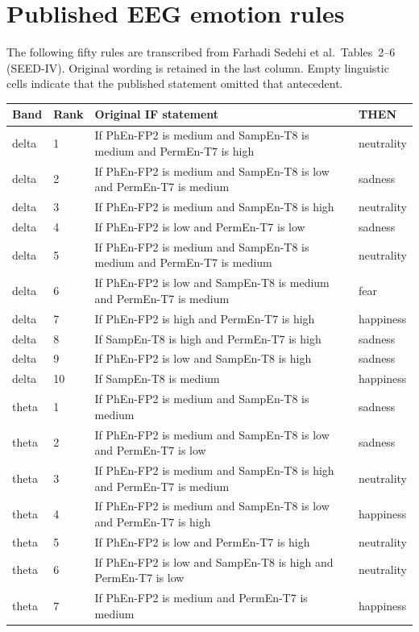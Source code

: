 \section{Published EEG emotion rules}
The following fifty rules are transcribed from Farhadi Sedehi et al.\ Tables~2--6 (SEED-IV). Original wording is retained in the last column. Empty linguistic cells indicate that the published statement omitted that antecedent.
\begin{longtable}{llp{7.2cm}l}
\toprule Band & Rank & Original IF statement & THEN \\
\midrule \endhead
delta & 1 & If PhEn-FP2 is medium and SampEn-T8 is medium and PermEn-T7 is high & neutrality \\
delta & 2 & If PhEn-FP2 is medium and SampEn-T8 is low and PermEn-T7 is medium & sadness \\
delta & 3 & If PhEn-FP2 is medium and SampEn-T8 is high & neutrality \\
delta & 4 & If PhEn-FP2 is low and PermEn-T7 is low & sadness \\
delta & 5 & If PhEn-FP2 is medium and SampEn-T8 is medium and PermEn-T7 is medium & neutrality \\
delta & 6 & If PhEn-FP2 is low and SampEn-T8 is medium and PermEn-T7 is medium & fear \\
delta & 7 & If PhEn-FP2 is high and PermEn-T7 is high & happiness \\
delta & 8 & If SampEn-T8 is high and PermEn-T7 is high & sadness \\
delta & 9 & If PhEn-FP2 is low and SampEn-T8 is high & sadness \\
delta & 10 & If SampEn-T8 is medium & happiness \\
theta & 1 & If PhEn-FP2 is medium and SampEn-T8 is medium & sadness \\
theta & 2 & If PhEn-FP2 is medium and SampEn-T8 is low and PermEn-T7 is low & sadness \\
theta & 3 & If PhEn-FP2 is medium and SampEn-T8 is high and PermEn-T7 is medium & neutrality \\
theta & 4 & If PhEn-FP2 is medium and SampEn-T8 is low and PermEn-T7 is high & happiness \\
theta & 5 & If PhEn-FP2 is low and PermEn-T7 is high & neutrality \\
theta & 6 & If PhEn-FP2 is low and SampEn-T8 is high and PermEn-T7 is low & neutrality \\
theta & 7 & If PhEn-FP2 is medium and PermEn-T7 is medium & happiness \\

\end{longtable}
